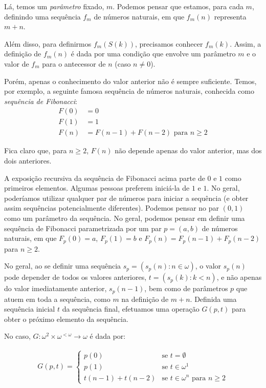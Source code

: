 Lá, temos um \emph{parâmetro} fixado, $m$.
Podemos pensar que estamos, para cada $m$, definindo uma sequência $f_m$ de números naturais, em que $f_m(n)$ representa $m+n$.

Além disso, para definirmos $f_m(S(k))$, precisamos conhecer $f_m(k)$.
Assim, a definição de $f_m(n)$ é dada por uma condição que envolve um parâmetro $m$ e o valor de $f_m$ para o antecessor de $n$ (caso $n\neq 0$).

Porém, apenas o conhecimento do valor anterior não é sempre suficiente.
Temos, por exemplo, a seguinte famosa sequência de números naturais, conhecida como \emph{sequência de Fibonacci}:
\begin{align*}
F(0) &= 0\\
F(1)&= 1\\
F(n)&= F(n-1) + F(n-2) \text{ para } n\geq 2
\end{align*}

Fica claro que, para $n\geq 2$, $F(n)$ não depende apenas do valor anterior, mas dos dois anteriores.

A exposição recursiva da sequência de Fibonacci acima parte de $0$ e $1$ como primeiros elementos.
Algumas pessoas preferem iniciá-la de $1$ e $1$.
No geral, poderíamos utilizar qualquer par de números para iniciar a sequência (e obter assim sequências potencialmente diferentes).
Podemos pensar no par $(0, 1)$ como um parâmetro da sequência.
No geral, podemos pensar em definir uma sequência de Fibonacci parametrizada por um par $p=(a, b)$ de números naturais, em que $F_p(0)=a$, $F_p(1)=b$ e $F_p(n)=F_p(n-1)+F_p(n-2)$ para $n\geq 2$.



No geral, ao se definir uma sequência $s_p=(s_p(n): n \in \omega)$, o valor $s_p(n)$ pode depender de todos os valores anteriores, $t=(s_p(k): k < n)$, e não apenas do valor imediatamente anterior, $s_p(n-1)$, bem como de parâmetros $p$ que atuem em toda a sequência, como $m$ na definição de $m+n$.
Definida uma sequência inicial $t$ da sequência final, efetuamos uma operação $G(p, t)$ para obter o próximo elemento da sequência.

No caso, $G:\omega^2\times \omega^{<\omega}\to \omega$ é dada por:

\begin{align*}
G(p, t) =
\begin{cases}
    p(0) & \text{se } t=\emptyset\\
    p(1) & \text{se } t \in \omega^1\\
    t(n-1)+t(n-2) & \text{se } t\in \omega^n \text{ para } n\geq 2
\end{cases}
\end{align*}

